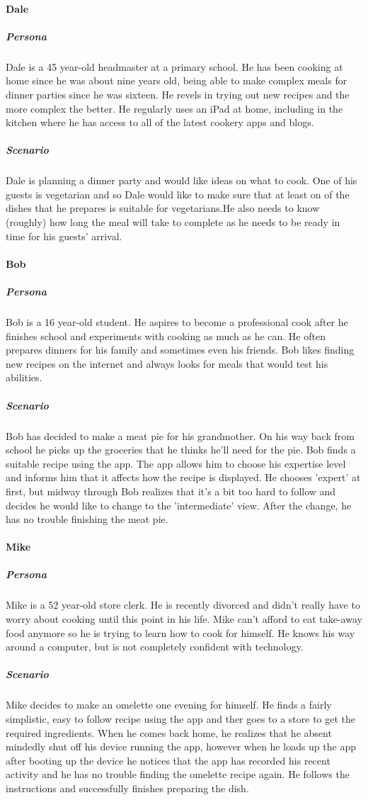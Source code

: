 \paragraph{Dale}
\subparagraph{Persona}
Dale is a 45 year-old headmaster at a primary school. He has been cooking at home
since he was about nine years old, being able to make complex meals for dinner
parties since he was sixteen. He revels in trying out new recipes and the more
complex the better. He regularly uses an iPad at home, including in the kitchen
where he has access to all of the latest cookery apps and blogs.
\subparagraph{Scenario}
Dale is planning a dinner party and would like ideas on what to cook. One of his
guests is vegetarian and so Dale would like to make sure that at least on of the
dishes that he prepares is suitable for vegetarians.He also needs to know (roughly) 
how long the meal will take to complete as he needs to be ready in time for his 
guests' arrival.

\paragraph{Bob}
\subparagraph{Persona}
Bob is a 16 year-old student. He aspires to become a professional cook after he 
finishes school and experiments with cooking as much as he can. He often prepares
dinners for his family and sometimes even his friends. Bob likes finding new
recipes on the internet and always looks for meals that would test his abilities.
\subparagraph{Scenario}
Bob has decided to make a meat pie for his grandmother. On his way back from 
school he picks up the groceries that he thinks he'll need for the pie. Bob finds
a suitable recipe using the app. The app allows him to choose his expertise level
and informs him that it affects how the recipe is displayed. He chooses 'expert'
at first, but midway through Bob realizes that it's a bit too hard to follow and
decides he would like to change to the 'intermediate' view. After the change, he
has no trouble finishing the meat pie.

\paragraph{Mike}
\subparagraph{Persona}
Mike is a 52 year-old store clerk. He is recently divorced and didn't really have
to worry about cooking until this point in his life. Mike can't afford to eat
take-away food anymore so he is trying to learn how to cook for himself. He knows
his way around a computer, but is not completely confident with technology.
\subparagraph{Scenario}
Mike decides to make an omelette one evening for himself. He finds a fairly 
simplistic, easy to follow recipe using the app and ther goes to a store to get
the required ingredients. When he comes back home, he realizes that he absent
mindedly shut off his device running the app, however when he loads up the 
app after booting up the device he notices that the app has recorded his 
recent activity and he has no trouble finding the omelette recipe again. He
follows the instructions and successfully finishes preparing the dish.

